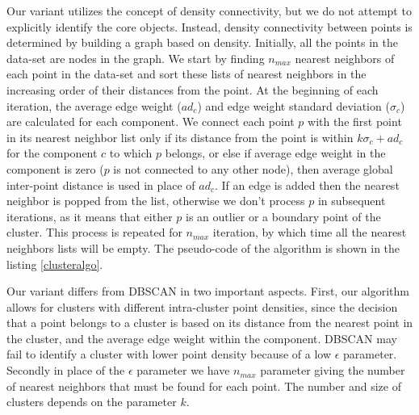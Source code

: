 Our variant utilizes the concept of density connectivity, but we do not
attempt to explicitly identify the core objects. Instead, density
connectivity between points is determined by building a graph based on
density. Initially, all the points in the data-set are nodes in the
graph. We start by finding $n_{max}$ nearest neighbors of each point in the
data-set and sort these lists of nearest neighbors in the increasing order
of their distances from the point. At the beginning of each iteration, the
average edge weight ($ad_c$) and edge weight standard deviation
(${\sigma}_c$) are calculated for each component.  We connect each point
$p$ with the first point in its nearest neighbor list only if its distance
from the point is within $k{\sigma}_c + ad_c$ for the component $c$ to
which $p$ belongs, or else if average edge weight in the component is zero
($p$ is not connected to any other node), then average global inter-point
distance is used in place of $ad_c$. If an edge is added then the nearest
neighbor is popped from the list, otherwise we don't process $p$ in
subsequent iterations, as it means that either $p$ is an outlier or a
boundary point of the cluster. This process is repeated for $n_{max}$
iteration, by which time all the nearest neighbors lists will be empty. The
pseudo-code of the algorithm is shown in the listing \ref{clusteralgo}.

Our variant differs from DBSCAN in two important aspects. First, our
algorithm allows for clusters with different intra-cluster point densities,
since the decision that a point belongs to a cluster is based on its
distance from the nearest point in the cluster, and the average edge weight
within the component.  DBSCAN may fail to identify a cluster with lower
point density because of a low $\epsilon$ parameter. Secondly in place of
the $\epsilon$ parameter we have $n_{max}$ parameter giving the number of
nearest neighbors that must be found for each point. The number and size of
clusters depends on the parameter $k$.


